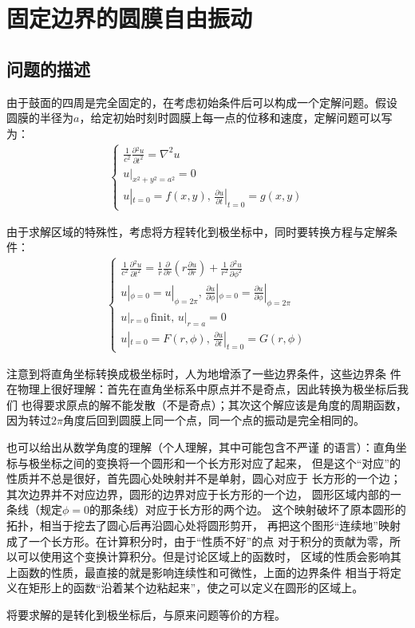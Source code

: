 \documentclass[a4paper]{ctexart}
\newcommand{\mr}[1]{\mathrm{#1}}
\newcommand{\pdv}[2]{\frac{\partial{#1}}{\partial{#2}}}
\begin{document}
	\section{固定边界的圆膜自由振动}
	\subsection{问题的描述}
	由于鼓面的四周是完全固定的，在考虑初始条件后可以构成一个定解问题。假设
	圆膜的半径为$a$，给定初始时刻时圆膜上每一点的位移和速度，定解问题可以写为：
	\begin{align}
		\left\{
			\begin{array}{lr}
				\displaystyle\frac{1}{c^2}\pdv{^{2}u}{t^2} = \nabla^{2}u\\
				u|_{x^2 + y^2 = a^2} = 0\\
				u|_{t=0} = f(x, y),\, \pdv{u}{t}|_{t=0} = g(x, y)
			\end{array}
		\right.
	\end{align}
	\par 由于求解区域的特殊性，考虑将方程转化到极坐标中，同时要转换方程与定解条件：
	\begin{align}
		\left\{
			\begin{array}{lr}
				\displaystyle\frac{1}{c^2}\pdv{^{2}u}{t^2} = \frac{1}{r}\pdv{}{r}\left(r\pdv{u}{r}\right) + \frac{1}{r^2}\pdv{^2 u}{\phi^{2}}\\
				u|_{\phi=0} = u|_{\phi=2\pi},\, \pdv{u}{\phi}|_{\phi=0} = \pdv{u}{\phi}|_{\phi=2\pi}\\
				u|_{r=0}\,\mr{finit},\, u|_{r=a}=0\\
				u|_{t=0} = F(r, \phi),\, \pdv{u}{t}|_{t=0} = G(r, \phi)
			\end{array}
		\right.
	\end{align}
	\par 注意到将直角坐标转换成极坐标时，人为地增添了一些边界条件，这些边界条
	件在物理上很好理解：首先在直角坐标系中原点并不是奇点，因此转换为极坐标后我们
	也得要求原点的解不能发散（不是奇点）；其次这个解应该是角度的周期函数，
	因为转过$2\pi$角度后回到圆膜上同一个点，同一个点的振动是完全相同的。
	\par 也可以给出从数学角度的理解（个人理解，其中可能包含不严谨
	的语言）：直角坐标与极坐标之间的变换将一个圆形和一个长方形对应了起来，
	但是这个“对应”的性质并不总是很好，首先圆心处映射并不是单射，圆心对应于
	长方形的一个边；其次边界并不对应边界，圆形的边界对应于长方形的一个边，
	圆形区域内部的一条线（规定$\phi=0$的那条线）对应于长方形的两个边。
	这个映射破坏了原本圆形的拓扑，相当于挖去了圆心后再沿圆心处将圆形剪开，
	再把这个图形“连续地”映射成了一个长方形。在计算积分时，由于“性质不好”的点
	对于积分的贡献为零，所以可以使用这个变换计算积分。但是讨论区域上的函数时，
	区域的性质会影响其上函数的性质，最直接的就是影响连续性和可微性，上面的边界条件
	相当于将定义在矩形上的函数“沿着某个边粘起来”，使之可以定义在圆形的区域上。
	\par 将要求解的是转化到极坐标后，与原来问题等价的方程。
\end{document}
